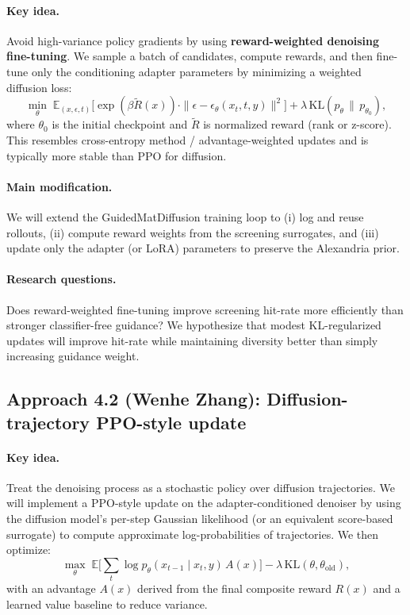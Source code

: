 \documentclass{article}
\begin{document}
\paragraph{Key idea.}
Avoid high-variance policy gradients by using \textbf{reward-weighted denoising fine-tuning}.
We sample a batch of candidates, compute rewards, and then fine-tune only the conditioning adapter parameters by minimizing a weighted diffusion loss:
\[
\min_{\theta}\; \mathbb{E}_{(x,\epsilon,t)}\Big[ \exp(\beta \tilde{R}(x))\cdot \|\epsilon - \epsilon_{\theta}(x_t, t, y)\|^2 \Big] + \lambda\,\mathrm{KL}(p_{\theta}\,\|\,p_{\theta_0}),
\]
where $\theta_0$ is the initial checkpoint and $\tilde{R}$ is normalized reward (rank or z-score).
This resembles cross-entropy method / advantage-weighted updates and is typically more stable than PPO for diffusion.

\paragraph{Main modification.}
We will extend the GuidedMatDiffusion training loop to (i) log and reuse rollouts, (ii) compute reward weights from the screening surrogates, and (iii) update only the adapter (or LoRA) parameters to preserve the Alexandria prior.

\paragraph{Research questions.}
Does reward-weighted fine-tuning improve screening hit-rate more efficiently than stronger classifier-free guidance?
We hypothesize that modest KL-regularized updates will improve hit-rate while maintaining diversity better than simply increasing guidance weight.

\subsection{Approach 4.2 (Wenhe Zhang): Diffusion-trajectory PPO-style update}
\paragraph{Key idea.}
Treat the denoising process as a stochastic policy over diffusion trajectories.
We will implement a PPO-style update on the adapter-conditioned denoiser by using the diffusion model's per-step Gaussian likelihood (or an equivalent score-based surrogate) to compute approximate log-probabilities of trajectories.
We then optimize:
\[
\max_{\theta}\; \mathbb{E}\Big[\sum_t \log p_{\theta}(x_{t-1}\mid x_t,y)\,A(x)\Big] - \lambda\,\mathrm{KL}(\theta,\theta_{\mathrm{old}}),
\]
with an advantage $A(x)$ derived from the final composite reward $R(x)$ and a learned value baseline to reduce variance.
\end{document}
